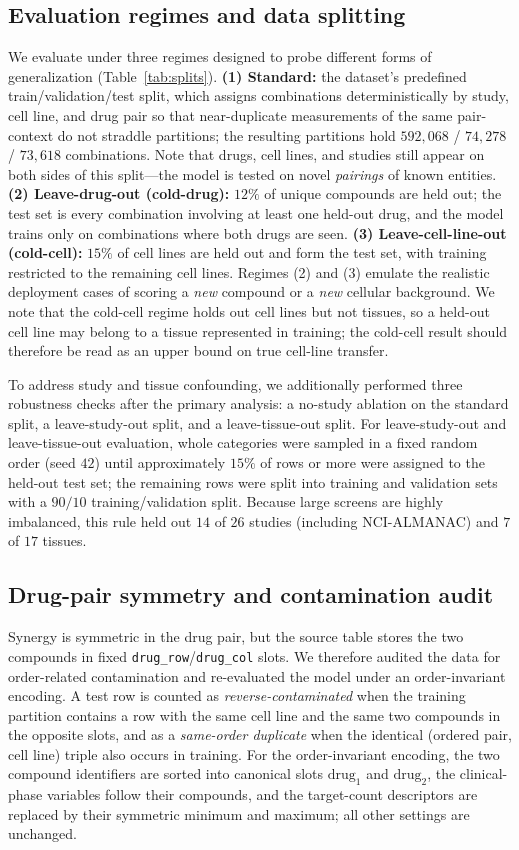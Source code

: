 \documentclass[11pt]{article}
\begin{document}
\subsection{Evaluation regimes and data splitting}
We evaluate under three regimes designed to probe different forms of generalization
(Table~\ref{tab:splits}). \textbf{(1) Standard:} the dataset's predefined train/validation/test split,
which assigns combinations deterministically by study, cell line, and drug pair so that near-duplicate
measurements of the same pair-context do not straddle partitions; the resulting partitions hold
$592{,}068$ / $74{,}278$ / $73{,}618$ combinations. Note that drugs, cell lines, and studies still
appear on both sides of this split---the model is tested on novel \emph{pairings} of known entities.
\textbf{(2) Leave-drug-out (cold-drug):} $12\%$ of unique compounds are held out; the test set is every
combination involving at least one held-out drug, and the model trains only on combinations where both
drugs are seen. \textbf{(3) Leave-cell-line-out (cold-cell):} $15\%$ of cell lines are held out and form
the test set, with training restricted to the remaining cell lines. Regimes (2) and (3) emulate the
realistic deployment cases of scoring a \emph{new} compound or a \emph{new} cellular background. We
note that the cold-cell regime holds out cell lines but not tissues, so a held-out cell line may belong
to a tissue represented in training; the cold-cell result should therefore be read as an upper bound on
true cell-line transfer.

To address study and tissue confounding, we additionally performed three robustness checks after the
primary analysis: a no-study ablation on the standard split, a leave-study-out split, and a
leave-tissue-out split. For leave-study-out and leave-tissue-out evaluation, whole categories were
sampled in a fixed random order (seed $42$) until approximately $15\%$ of rows or more were assigned to
the held-out test set; the remaining rows were split into training and validation sets with a $90/10$
training/validation split. Because large screens are highly imbalanced, this rule held out $14$ of
$26$ studies (including NCI-ALMANAC) and $7$ of $17$ tissues.

\subsection{Drug-pair symmetry and contamination audit}
Synergy is symmetric in the drug pair, but the source table stores the two compounds in fixed
\texttt{drug\_row}/\texttt{drug\_col} slots. We therefore audited the data for order-related
contamination and re-evaluated the model under an order-invariant encoding. A test row is counted as
\emph{reverse-contaminated} when the training partition contains a row with the same cell line and the
same two compounds in the opposite slots, and as a \emph{same-order duplicate} when the identical
(ordered pair, cell line) triple also occurs in training. For the order-invariant encoding, the two
compound identifiers are sorted into canonical slots $\mathrm{drug}_1$ and $\mathrm{drug}_2$, the
clinical-phase variables follow their compounds, and the target-count descriptors are replaced by their
symmetric minimum and maximum; all other settings are unchanged.
\end{document}
